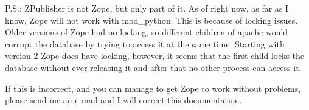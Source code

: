 P.S.: ZPublisher is not Zope, but only part of it. As of right now, as
far as I know, Zope will not work with mod_python. This is because of
locking issues. Older versions of Zope had no locking, so different
children of apache would corrupt the database by trying to access it
at the same time.  Starting with version 2 Zope does have locking,
however, it seems that the first child locks the database without ever
releasing it and after that no other process can access it.

If this is incorrect, and you can manage to get Zope to work without
problems, please send me an e-mail and I will correct this
documentation.

